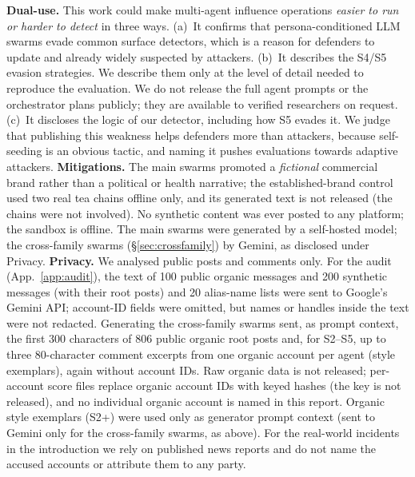 \documentclass[10pt]{article}
\begin{document}
\textbf{Dual-use.} This work could make multi-agent influence operations \emph{easier to run or harder to detect} in three ways.
(a)~It confirms that persona-conditioned LLM swarms evade common surface detectors, which is a reason for defenders to update and already widely suspected by attackers.
(b)~It describes the S4/S5 evasion strategies. We describe them only at the level of detail needed to reproduce the evaluation. We do not release the full agent prompts or the orchestrator plans publicly; they are available to verified researchers on request.
(c)~It discloses the logic of our detector, including how S5 evades it. We judge that publishing this weakness helps defenders more than attackers, because self-seeding is an obvious tactic, and naming it pushes evaluations towards adaptive attackers.
\textbf{Mitigations.} The main swarms promoted a \emph{fictional} commercial brand rather than a political or health narrative; the established-brand control used two real tea chains offline only, and its generated text is not released (the chains were not involved). No synthetic content was ever posted to any platform; the sandbox is offline. The main swarms were generated by a self-hosted model; the cross-family swarms (\S\ref{sec:crossfamily}) by Gemini, as disclosed under Privacy.
\textbf{Privacy.} We analysed public posts and comments only. For the audit (App.~\ref{app:audit}), the text of 100 public organic messages and 200 synthetic messages (with their root posts) and 20 alias-name lists were sent to Google's Gemini API; account-ID fields were omitted, but names or handles inside the text were not redacted. Generating the cross-family swarms sent, as prompt context, the first 300 characters of 806 public organic root posts and, for S2--S5, up to three 80-character comment excerpts from one organic account per agent (style exemplars), again without account IDs. Raw organic data is not released; per-account score files replace organic account IDs with keyed hashes (the key is not released), and no individual organic account is named in this report. Organic style exemplars (S2+) were used only as generator prompt context (sent to Gemini only for the cross-family swarms, as above). For the real-world incidents in the introduction we rely on published news reports and do not name the accused accounts or attribute them to any party.
\end{document}
